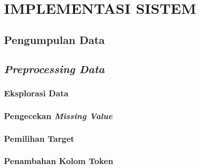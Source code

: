\documentclass[ugmtesis]{ugmtesis}
\begin{document}



\chapter{IMPLEMENTASI SISTEM}
\label{IMPLEMENTASI SISTEM}


	\section{Pengumpulan Data}
	\label{implementasi pengumpulan data}
	

	\section{\textit{Preprocessing Data}}
	\label{implementasi preprocessing data}
	

		\subsection{Eksplorasi Data}
		\label{implementasi eksplorasi data}
		

		\subsection{Pengecekan \textit{Missing Value}}
		\label{implementasi pengecekan missing value}
		
		
		\subsection{Pemilihan Target}
		\label{implementasi pemilihan target}
		

		\subsection{Penambahan Kolom Token}
		\label{implementasi penambahan kolom token}
		
\end{document}
